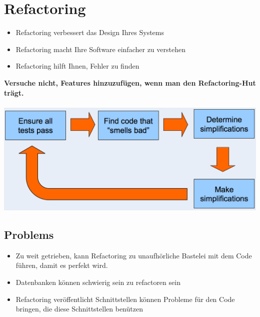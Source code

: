 \documentclass[a4paper,10pt]{article}
\newcommand{\Bold}[1]{\textbf{#1}} %
\begin{document}
\pagebreak
\section{Refactoring}
\begin{itemize}
	\item Refactoring verbessert das Design Ihres Systems
	\item Refactoring macht Ihre Software einfacher zu verstehen
	\item Refactoring hilft Ihnen, Fehler zu finden
\end{itemize}
\Bold {Versuche nicht, Features hinzuzuf\"{u}gen, wenn man den  Refactoring-Hut tr\"{a}gt.} \\ \\
\includegraphics[scale=0.4]{refactoring_workflow.png}

\subsection{Problems}
\begin{itemize}
	\item Zu weit getrieben, kann Refactoring zu unaufh\"{o}rliche Bastelei mit dem Code f\"{u}hren, damit es perfekt wird.
	\item Datenbanken k\"{o}nnen schwierig sein zu refactoren sein
	\item Refactoring ver\"{o}ffentlicht Schnittstellen k\"{o}nnen Probleme f\"{u}r den Code bringen, die diese Schnittstellen ben\"{u}tzen
\end{itemize}
\end{document}
